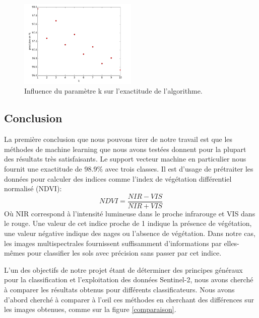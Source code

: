 \documentclass[a4paper,10pt]{report}
\begin{document}
\begin{figure}[H]
  \centering
    \includegraphics[width=0.5\textwidth]{influencek}
  \caption{Influence du paramètre k sur l'exactitude de l'algorithme.}
  \label{fig:kNN}
\end{figure}

\subsection{Conclusion}
La première conclusion que nous pouvons tirer de notre travail est que les méthodes de machine learning que nous avons testées donnent pour la plupart des résultats très satisfaisants. Le support vecteur machine en particulier nous fournit une exactitude de 98.9\% avec trois classes. Il est d'usage de prétraiter les données pour calculer des indices comme l'index de végétation différentiel normalisé (NDVI)\cite{NDVI}:
\begin{equation}
NDVI=\frac{NIR-VIS}{NIR+VIS}
\end{equation}
Où NIR correspond à l'intensité lumineuse dans le proche infrarouge et VIS dans le rouge. Une valeur de cet indice proche de 1 indique la présence de végétation, une valeur négative indique des nages ou l'absence de végétation. Dans notre cas, les images multispectrales fournissent suffisamment d'informations par elles-mêmes pour classifier les sols avec précision sans passer par cet indice.

L'un des objectifs de notre projet étant de déterminer des principes généraux pour la classification et l'exploitation des données Sentinel-2, nous avons cherché à comparer les résultats obtenus pour différents classificateurs. Nous avons d'abord cherché à comparer à l'œil ces méthodes en cherchant des différences sur les images obtenues, comme sur la figure \ref{comparaison}.
\end{document}
